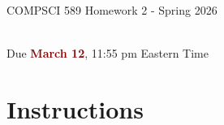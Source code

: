 \documentclass{article}
\begin{document}
\newpage
\vspace*{1cm}
\begin{center}
    \begin{Large}
    COMPSCI 589 Homework 2 - Spring 2026
    \end{Large}
    \\
    \vspace{0.15cm}
    Due \textcolor{darkred}{\textbf{March 12}}, 11:55 pm Eastern Time
\end{center}



\vspace{0.5cm}
\section*{Instructions}
\vspace{0.5cm}
\end{document}
